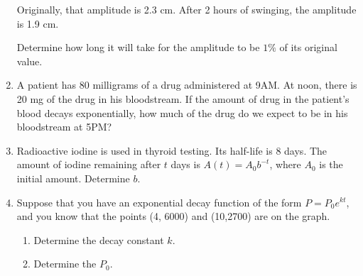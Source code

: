 \begin{enumerate}
Originally, that amplitude is 2.3 cm. After 2 hours of swinging, the amplitude is 1.9 cm.

Determine how long it will take for the amplitude to be $1\%$ of its original value.
\vfill
\item A patient has 80 milligrams of a drug administered at 9AM.  At noon, there is 20 mg of the drug in his bloodstream.  If the amount of drug in the patient's blood decays exponentially, how much of the drug do we expect to be in his bloodstream at 5PM?\vfill

%

\newpage

\item Radioactive iodine is used in thyroid testing.  Its half-life is 8 days.  The amount of iodine remaining after $t$ days is $A(t)=A_0b^{-t}$, where $A_0$ is the initial amount.  Determine $b$.\vfill

\item Suppose that you have an exponential decay function of the form $P=P_0e^{kt}$, and you know that the points (4, 6000) and (10,2700) are on the graph.
\begin{enumerate}
\item Determine the decay constant $k$.
\vfill
\vfill
\item Determine the $P_0$.
\vfill
\end{enumerate}



\end{enumerate}


